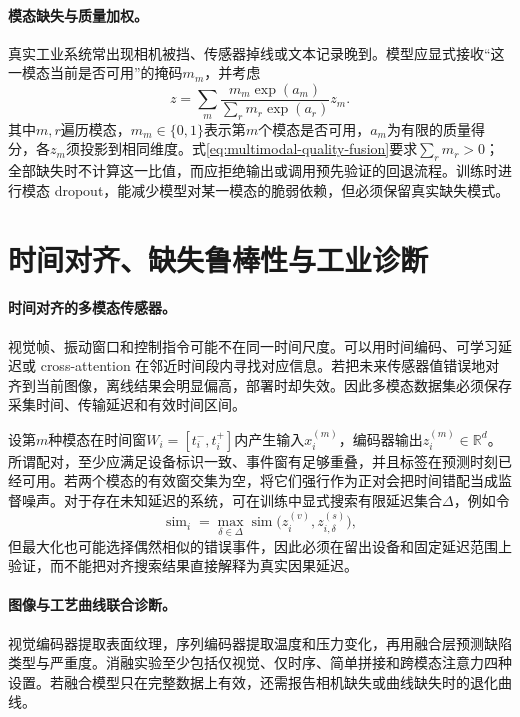 \paragraph{模态缺失与质量加权。}
真实工业系统常出现相机被挡、传感器掉线或文本记录晚到。模型应显式接收“这一模态当前是否可用”的掩码$m_m$，并考虑
\begin{equation}
 z=\sum_m\frac{m_m\exp(a_m)}{\sum_r m_r\exp(a_r)}z_m.\label{eq:multimodal-quality-fusion}
\end{equation}
其中$m,r$遍历模态，$m_m\in\{0,1\}$表示第$m$个模态是否可用，$a_m$为有限的质量得分，各$z_m$须投影到相同维度。式\eqref{eq:multimodal-quality-fusion}要求$\sum_r m_r>0$；全部缺失时不计算这一比值，而应拒绝输出或调用预先验证的回退流程。训练时进行模态 dropout，能减少模型对某一模态的脆弱依赖，但必须保留真实缺失模式。

\section{时间对齐、缺失鲁棒性与工业诊断}
\paragraph{时间对齐的多模态传感器。}
视觉帧、振动窗口和控制指令可能不在同一时间尺度。可以用时间编码、可学习延迟或 cross-attention 在邻近时间段内寻找对应信息。若把未来传感器值错误地对齐到当前图像，离线结果会明显偏高，部署时却失效。因此多模态数据集必须保存采集时间、传输延迟和有效时间区间。

设第$m$种模态在时间窗$W_i=[t_i^-,t_i^+]$内产生输入$x_i^{(m)}$，编码器输出$z_i^{(m)}
\in\mathbb R^d$。所谓配对，至少应满足设备标识一致、事件窗有足够重叠，并且标签在预测时刻已经可用。若两个模态的有效窗交集为空，将它们强行作为正对会把时间错配当成监督噪声。对于存在未知延迟的系统，可在训练中显式搜索有限延迟集合$\Delta$，例如令
\[
\operatorname{sim}_i=\max_{\delta\in\Delta}\operatorname{sim}\bigl(z_i^{(v)},z_{i,\delta}^{(s)}\bigr),
\]
但最大化也可能选择偶然相似的错误事件，因此必须在留出设备和固定延迟范围上验证，而不能把对齐搜索结果直接解释为真实因果延迟。

\paragraph{图像与工艺曲线联合诊断。}
视觉编码器提取表面纹理，序列编码器提取温度和压力变化，再用融合层预测缺陷类型与严重度。消融实验至少包括仅视觉、仅时序、简单拼接和跨模态注意力四种设置。若融合模型只在完整数据上有效，还需报告相机缺失或曲线缺失时的退化曲线。

